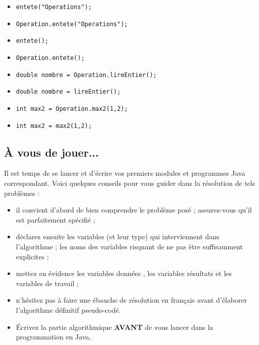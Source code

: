 \documentclass[11pt,a4paper]{article}
\begin{document}
            \begin{itemize} 
        
            \item[ \ding{"6F} ] \verb|entete("Operations");|
        
            \item[ \ding{"6F} ] \verb|Operation.entete("Operations");|
        
            \item[ \ding{"6F} ] \verb|entete();|
        
            \item[ \ding{"6F} ] \verb|Operation.entete();|
        
            \item[ \ding{"6F} ] \verb|double nombre = Operation.lireEntier();|
        
            \item[ \ding{"6F} ] \verb|double nombre = lireEntier();|
        
            \item[ \ding{"6F} ] \verb|int max2 = Operation.max2(1,2);|
        
            \item[ \ding{"6F} ] \verb|int max2 = max2(1,2);|
        
            \end{itemize} 
        \subsection{\`A vous de jouer...}
          Il est temps de se lancer et d'\'ecrire vos premiers modules et programmes Java correspondant. 
          Voici quelques conseils pour vous guider dans la r\'esolution de tels probl\`emes :
          
					\begin{itemize}
				
			\item il convient d'abord de bien comprendre le probl\`eme pos\'e ; assurez-vous qu'il est parfaitement sp\'ecifi\'e ;
			\item d\'eclarez ensuite les variables (et leur type) qui interviennent dans l'algorithme ; les noms des variables risquant de ne pas \^etre suffisamment explicites ;
			\item mettez en \'evidence les variables \guillemotleft  donn\'ees \guillemotright , les variables \guillemotleft  r\'esultats \guillemotright  et les variables de travail ;
			\item n'h\'esitez pas \`a faire une \'ebauche de r\'esolution en fran\c cais avant d'\'elaborer l'algorithme d\'efinitif pseudo-cod\'e.
			\item \'Ecrivez la partie algorithmique \textbf{AVANT} de vous lancer dans la programmation en Java.
					\end{itemize}
				
\end{document}
